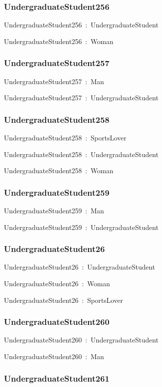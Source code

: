\documentclass{article}
\begin{document}
\subsubsection*{UndergraduateStudent256}

UndergraduateStudent256~:~UndergraduateStudent

UndergraduateStudent256~:~Woman

\subsubsection*{UndergraduateStudent257}

UndergraduateStudent257~:~Man

UndergraduateStudent257~:~UndergraduateStudent

\subsubsection*{UndergraduateStudent258}

UndergraduateStudent258~:~SportsLover

UndergraduateStudent258~:~UndergraduateStudent

UndergraduateStudent258~:~Woman

\subsubsection*{UndergraduateStudent259}

UndergraduateStudent259~:~Man

UndergraduateStudent259~:~UndergraduateStudent

\subsubsection*{UndergraduateStudent26}

UndergraduateStudent26~:~UndergraduateStudent

UndergraduateStudent26~:~Woman

UndergraduateStudent26~:~SportsLover

\subsubsection*{UndergraduateStudent260}

UndergraduateStudent260~:~UndergraduateStudent

UndergraduateStudent260~:~Man

\subsubsection*{UndergraduateStudent261}
\end{document}
